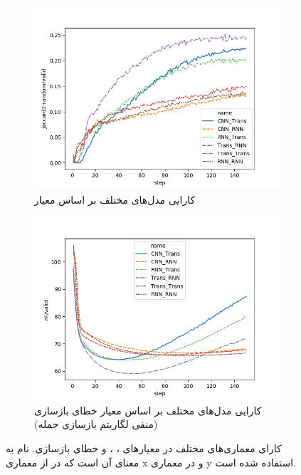 \begin{figure}[h]
\begin{subfigure}{0.3\textheight}
		\centering
		\includegraphics[width=1.\textwidth]{images/figs/jaccard2-random.png}
		\caption{کارایی مدل‌های مختلف بر اساس معیار \jaccard[-2]{}}
		\label{fig:chap4:archs_jac}
	\end{subfigure}
	\begin{subfigure}{0.3\textheight}
		\centering
		\includegraphics[width=1.\textwidth]{images/figs/nll.png}
		\caption{
			کارایی مدل‌های مختلف بر اساس معیار خطای بازسازی (منفی لگاریتم \likelihood{} باز‌سازی جمله)}
		\label{fig:chap4:archs_nll}
	\end{subfigure}
	\caption{
		کارای معماری‌های مختلف در معیارهای \bleu[-2]{}، \selfbleu[-2]{}، \jaccard[-2]{} و خطای بازسازی.
		نام  به معنای آن است که در \encoder{} از معماری x و در \decoder{} معماری y استفاده شده است.}
	\label{fig:chap4:archs}
\end{figure}

